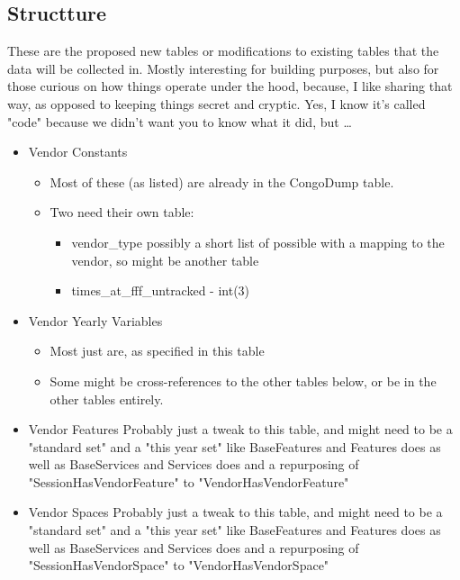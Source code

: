 \documentclass[captions=tablesignature]{scrartcl}
\begin{document}
\subsection{Structture}
\label{sec-2-5}
These are the proposed new tables or modifications to existing
tables that the data will be collected in.  Mostly interesting for
building purposes, but also for those curious on how things operate
under the hood, because, I like sharing that way, as opposed to
keeping things secret and cryptic.  Yes, I know it's called "code"
because we didn't want you to know what it did, but \ldots{} 
\begin{itemize}
\item Vendor Constants
\label{sec-2-5-1}
\begin{itemize}
\item Most of these (as listed) are already in the CongoDump table.
\item Two need their own table:
\begin{itemize}
\item vendor\_type
possibly a short list of possible with a mapping to the
vendor, so might be another table
\item times\_at\_fff\_untracked - int(3)
\end{itemize}
\end{itemize}

\item Vendor Yearly Variables
\label{sec-2-5-2}
\begin{itemize}
\item Most just are, as specified in this table
\item Some might be cross-references to the other tables below, or be
in the other tables entirely.
\end{itemize}

\item Vendor Features
\label{sec-2-5-3}
Probably just a tweak to this table, and might need to be a
"standard set" and a "this year set" like BaseFeatures and
Features does as well as BaseServices and Services does and a
repurposing of "SessionHasVendorFeature" to
"VendorHasVendorFeature"

\item Vendor Spaces
\label{sec-2-5-4}
Probably just a tweak to this table, and might need to be a
"standard set" and a "this year set" like BaseFeatures and
Features does as well as BaseServices and Services does and a
repurposing of "SessionHasVendorSpace" to "VendorHasVendorSpace"


\end{itemize}
\end{document}
